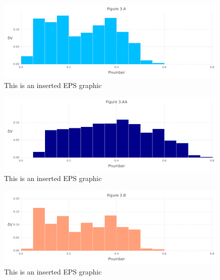 \documentclass[10pt,letterpaper]{article}
\begin{document}
\begin{figure}[ht]
\begin{center}
\includegraphics[scale=0.5]{1m14/3afigure_hi-precision.pdf}
\caption{This is an inserted EPS graphic}
\label{fig7}
\end{center}
\end{figure}

\begin{figure}[ht]
\begin{center}
\includegraphics[scale=0.5]{1m14/3aafigure_hi-precision.pdf}
\caption{This is an inserted EPS graphic}
\label{fig8}
\end{center}
\end{figure}

\begin{figure}[ht]
\begin{center}
\includegraphics[scale=0.5]{1m14/3bfigure_hi-precision.pdf}
\caption{This is an inserted EPS graphic}
\label{fig10}
\end{center}
\end{figure}
\end{document}
